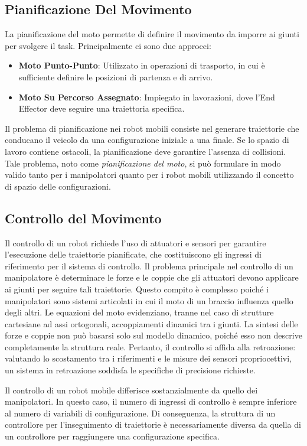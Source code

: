 \documentclass[11pt, a4paper]{report}
\begin{document}
\subsection{Pianificazione Del Movimento}
La pianificazione del moto permette di definire il movimento da imporre ai giunti per svolgere il task. Principalmente ci sono due approcci:
\begin{itemize}
    \item \textbf{Moto Punto-Punto}: Utilizzato in operazioni di trasporto, in cui è sufficiente definire le posizioni di partenza e di arrivo.
    \item \textbf{Moto Su Percorso Assegnato}: Impiegato in lavorazioni, dove l'End Effector deve seguire una traiettoria specifica.
\end{itemize}
Il problema di pianificazione nei robot mobili consiste nel generare traiettorie che conducano il veicolo da una configurazione iniziale a una finale. Se lo spazio di lavoro contiene ostacoli, la pianificazione deve garantire l'assenza di collisioni. Tale problema, noto come \textit{pianificazione del moto}, si può formulare in modo valido tanto per i manipolatori quanto per i robot mobili utilizzando il concetto di spazio delle configurazioni.

\subsection{Controllo del Movimento}
Il controllo di un robot richiede l'uso di attuatori e sensori per garantire l'esecuzione delle traiettorie pianificate, che costituiscono gli ingressi di riferimento per il sistema di controllo. Il problema principale nel controllo di un manipolatore è determinare le forze e le coppie che gli attuatori devono applicare ai giunti per seguire tali traiettorie. Questo compito è complesso poiché i manipolatori sono sistemi articolati in cui il moto di un braccio influenza quello degli altri. Le equazioni del moto evidenziano, tranne nel caso di strutture cartesiane ad assi ortogonali, accoppiamenti dinamici tra i giunti. La sintesi delle forze e coppie non può basarsi solo sul modello dinamico, poiché esso non descrive completamente la struttura reale. Pertanto, il controllo si affida alla retroazione: valutando lo scostamento tra i riferimenti e le misure dei sensori propriocettivi, un sistema in retroazione soddisfa le specifiche di precisione richieste.

Il controllo di un robot mobile differisce sostanzialmente da quello dei manipolatori. In questo caso, il numero di ingressi di controllo è sempre inferiore al numero di variabili di configurazione. Di conseguenza, la struttura di un controllore per l'inseguimento di traiettorie è necessariamente diversa da quella di un controllore per raggiungere una configurazione specifica.
\end{document}
